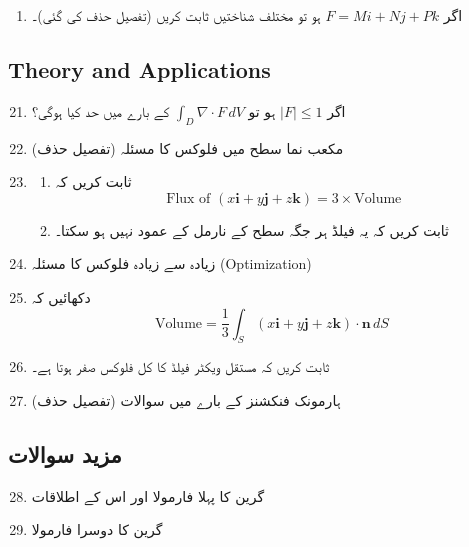 \begin{enumerate}
\begin{enumerate}
\item اگر \(F=Mi+Nj+Pk\) ہو تو مختلف شناختیں ثابت کریں (تفصیل حذف کی گئی)۔
\end{enumerate}

\subsection*{Theory and Applications}

\begin{enumerate}
\setcounter{enumi}{20}

\item اگر \(|F|\le 1\) ہو تو \(\int_D \nabla \cdot F\, dV\) کے بارے میں حد کیا ہوگی؟

\item مکعب نما سطح میں فلوکس کا مسئلہ (تفصیل حذف)

\item
\begin{enumerate}
\item ثابت کریں کہ
\[
\text{Flux of } (x\mathbf{i}+y\mathbf{j}+z\mathbf{k}) = 3 \times \text{Volume}
\]

\item ثابت کریں کہ یہ فیلڈ ہر جگہ سطح کے نارمل کے عمود نہیں ہو سکتا۔
\end{enumerate}

\item زیادہ سے زیادہ فلوکس کا مسئلہ (Optimization)

\item دکھائیں کہ
\[
\text{Volume} = \frac{1}{3} \int_S (x\mathbf{i}+y\mathbf{j}+z\mathbf{k}) \cdot \mathbf{n}\, dS
\]

\item ثابت کریں کہ مستقل ویکٹر فیلڈ کا کل فلوکس صفر ہوتا ہے۔

\item ہارمونک فنکشنز کے بارے میں سوالات (تفصیل حذف)
\end{enumerate}

\subsection*{مزید سوالات}

\begin{enumerate}
\setcounter{enumi}{27}

\item گرین کا پہلا فارمولا اور اس کے اطلاقات

\item گرین کا دوسرا فارمولا


\end{enumerate}
\end{enumerate}
